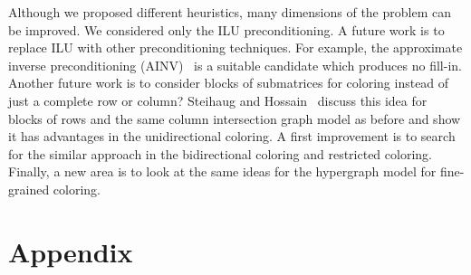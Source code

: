 \documentclass[12pt, twoside,a4paper,toc=bibliography]{scrbook}
\begin{document}
Although we proposed different heuristics, many dimensions of the problem can be improved.
We considered only the ILU preconditioning. A future work is to replace ILU
with other preconditioning techniques.
For example, the approximate inverse preconditioning (AINV)~\cite{ainv98} is a
suitable candidate which produces no fill-in.
Another future work is to consider blocks of submatrices for coloring instead of just a complete row or column? Steihaug and Hossain~\cite{Steihaug1997GCa} discuss this idea for blocks of rows and the same column intersection graph model as before and show it has advantages in the unidirectional coloring. A first improvement is to search for the similar approach in the bidirectional coloring and restricted coloring. Finally, a new area is to look at the same ideas for the hypergraph model for fine-grained coloring.



\chapter*{Appendix}
\label{appendix}
\setcounter{chapter}{1}
\renewcommand\thechapter{\Alph{chapter}}
\end{document}
